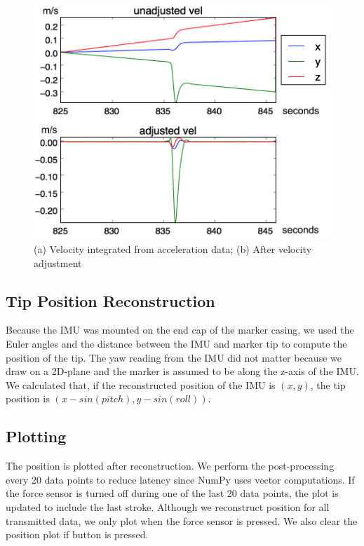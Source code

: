 \documentclass[12pt,journal]{IEEEtran}
\begin{document}
\begin{figure}[h]
    \includegraphics[width=\linewidth]{figures/vel-adjust}
  \caption{(a) Velocity integrated from acceleration data; (b) After velocity adjustment}
  \label{fig:vel-adjust}
\end{figure}

\subsection{Tip Position Reconstruction}
Because the IMU was mounted on the end cap of the marker casing, we used the Euler angles and the distance between the IMU and marker tip to compute the position of the tip. The yaw reading from the IMU did not matter because we draw on a 2D-plane and the marker is assumed to be along the z-axis of the IMU. We calculated that, if the reconstructed position of the IMU is $(x,y)$, the tip position is $(x-sin(pitch), y-sin(roll))$.

\subsection{Plotting}
  The position is plotted after reconstruction. We perform the post-processing every 20 data points to reduce latency since NumPy uses vector computations. If the force sensor is turned off during one of the last 20 data points, the plot is updated to include the last stroke. Although we reconstruct position for all transmitted data, we only plot when the force sensor is pressed. We also clear the position plot if button is pressed. 
\end{document}
